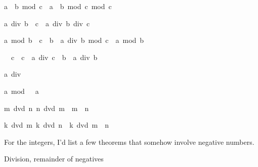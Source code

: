\begin{isabellebody}
\begin{isamarkuptext}
\begin{isabelle}%
a\ {\isacharasterisk}\ b\ mod\ c\ {\isacharequal}\ a\ {\isacharasterisk}\ {\isacharparenleft}b\ mod\ c{\isacharparenright}\ mod\ c%
\end{isabelle}

\begin{isabelle}%
a\ div\ {\isacharparenleft}b\ {\isacharasterisk}\ c{\isacharparenright}\ {\isacharequal}\ a\ div\ b\ div\ c%
\end{isabelle}

\begin{isabelle}%
a\ mod\ {\isacharparenleft}b\ {\isacharasterisk}\ c{\isacharparenright}\ {\isacharequal}\ b\ {\isacharasterisk}\ {\isacharparenleft}a\ div\ b\ mod\ c{\isacharparenright}\ {\isacharplus}\ a\ mod\ b%
\end{isabelle}

\begin{isabelle}%
{}\ {\isacharless}\ c\ {\isasymLongrightarrow}\ c\ {\isacharasterisk}\ a\ div\ {\isacharparenleft}c\ {\isacharasterisk}\ b{\isacharparenright}\ {\isacharequal}\ a\ div\ b%
\end{isabelle}

\begin{isabelle}%
a\ div\ {}\ {\isacharequal}\ {}%
\end{isabelle}

\begin{isabelle}%
a\ mod\ {}\ {\isacharequal}\ a%
\end{isabelle}

\begin{isabelle}%
{\isasymlbrakk}m\ dvd\ n{\isacharsemicolon}\ n\ dvd\ m{\isasymrbrakk}\ {\isasymLongrightarrow}\ m\ {\isacharequal}\ n%
\end{isabelle}

\begin{isabelle}%
{\isasymlbrakk}k\ dvd\ m{\isacharsemicolon}\ k\ dvd\ n{\isasymrbrakk}\ {\isasymLongrightarrow}\ k\ dvd\ m\ {\isacharplus}\ n%
\end{isabelle}

For the integers, I'd list a few theorems that somehow involve negative 
numbers.%
\end{isamarkuptext}%
\isamarkuptrue%
%
\begin{isamarkuptext}%
Division, remainder of negatives



\end{isamarkuptext}
\end{isabellebody}
